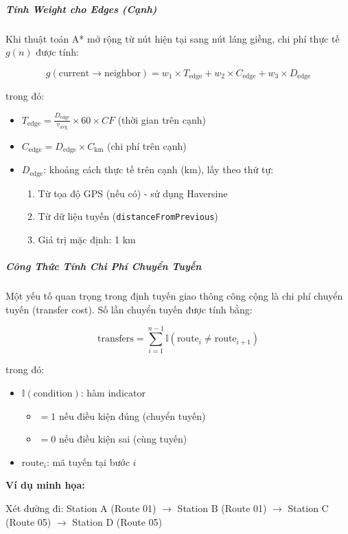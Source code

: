 \subparagraph{Tính Weight cho Edges (Cạnh)}

Khi thuật toán A* mở rộng từ nút hiện tại sang nút láng giềng, chi phí thực tế $g(n)$ được tính:

\[
g(\text{current} \rightarrow \text{neighbor}) = w_1 \times T_{\text{edge}} + w_2 \times C_{\text{edge}} + w_3 \times D_{\text{edge}}
\]

trong đó:

\begin{itemize}
    \item $T_{\text{edge}} = \frac{D_{\text{edge}}}{v_{\text{avg}}} \times 60 \times CF$ (thời gian trên cạnh)
    \item $C_{\text{edge}} = D_{\text{edge}} \times C_{\text{km}}$ (chi phí trên cạnh)
    \item $D_{\text{edge}}$: khoảng cách thực tế trên cạnh (km), lấy theo thứ tự:
    \begin{enumerate}
        \item Từ tọa độ GPS (nếu có) - sử dụng Haversine
        \item Từ dữ liệu tuyến (\texttt{distanceFromPrevious})
        \item Giá trị mặc định: 1 km
    \end{enumerate}
\end{itemize}

\subparagraph{Công Thức Tính Chi Phí Chuyển Tuyến}

Một yếu tố quan trọng trong định tuyến giao thông công cộng là chi phí chuyển tuyến (transfer cost). Số lần chuyển tuyến được tính bằng:

\[
\text{transfers} = \sum_{i=1}^{n-1} \mathbb{I}(\text{route}_i \neq \text{route}_{i+1})
\]

trong đó:
\begin{itemize}
    \item $\mathbb{I}(\text{condition})$: hàm indicator
    \begin{itemize}
        \item $= 1$ nếu điều kiện đúng (chuyển tuyến)
        \item $= 0$ nếu điều kiện sai (cùng tuyến)
    \end{itemize}
    \item $\text{route}_i$: mã tuyến tại bước $i$
\end{itemize}

\textbf{Ví dụ minh họa:}

Xét đường đi: Station A (Route 01) $\rightarrow$ Station B (Route 01) $\rightarrow$ Station C (Route 05) $\rightarrow$ Station D (Route 05)

